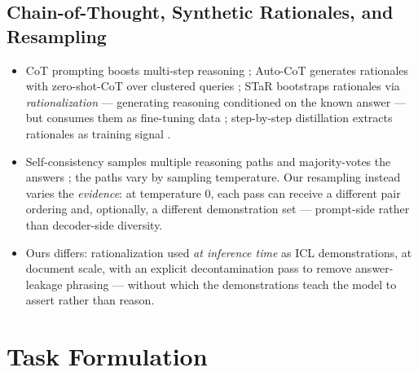 \documentclass[11pt]{article}
\begin{document}
\subsection{Chain-of-Thought, Synthetic Rationales, and Resampling}
\begin{itemize}
  \item CoT prompting boosts multi-step reasoning \citep{wei2022chain};
        Auto-CoT generates rationales with zero-shot-CoT over clustered queries
        \citep{zhang2023autocot}; STaR bootstraps rationales via
        \emph{rationalization} --- generating reasoning conditioned on the known
        answer --- but consumes them as fine-tuning data \citep{zelikman2022star};
        step-by-step distillation extracts rationales as training signal
        \citep{hsieh2023distilling}.
  \item Self-consistency samples multiple reasoning paths and majority-votes
        the answers \citep{wang2023selfconsistency}; the paths vary by sampling
        temperature. Our resampling instead varies the \emph{evidence}: at
        temperature 0, each pass can receive a different pair ordering and,
        optionally, a different demonstration set --- prompt-side rather than
        decoder-side diversity.
  \item Ours differs: rationalization used \emph{at inference time} as ICL
        demonstrations, at document scale, with an explicit decontamination pass
        to remove answer-leakage phrasing --- without which the demonstrations
        teach the model to assert rather than reason.
\end{itemize}

\section{Task Formulation}
\label{sec:task}
\end{document}

